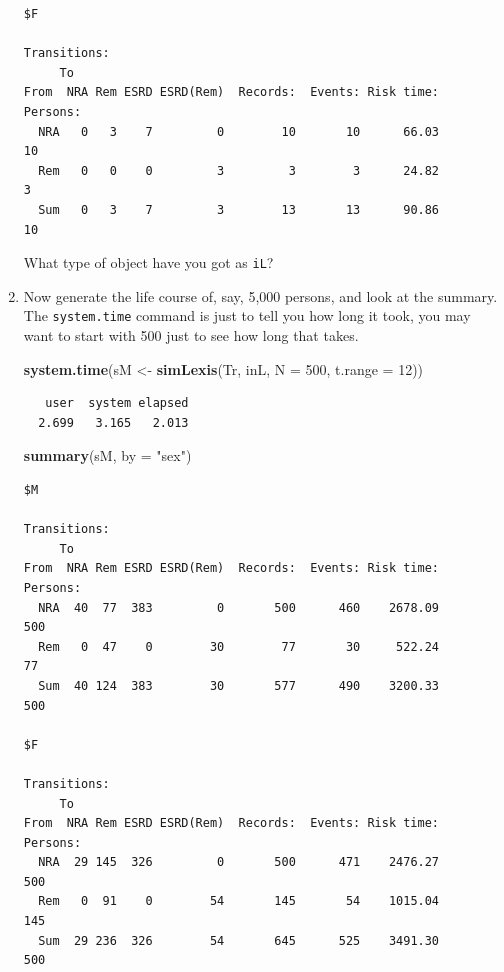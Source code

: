 \documentclass[
]{book}
\newenvironment{Shaded}{\begin{snugshade}}{\end{snugshade}}
\newcommand{\AttributeTok}[1]{\textcolor[rgb]{0.13,0.29,0.53}{#1}}
\newcommand{\DecValTok}[1]{\textcolor[rgb]{0.00,0.00,0.81}{#1}}
\newcommand{\FunctionTok}[1]{\textcolor[rgb]{0.13,0.29,0.53}{\textbf{#1}}}
\newcommand{\NormalTok}[1]{#1}
\newcommand{\OtherTok}[1]{\textcolor[rgb]{0.56,0.35,0.01}{#1}}
\newcommand{\StringTok}[1]{\textcolor[rgb]{0.31,0.60,0.02}{#1}}
\begin{document}
\begin{enumerate}
\begin{verbatim}
$F

Transitions:
     To
From  NRA Rem ESRD ESRD(Rem)  Records:  Events: Risk time:  Persons:
  NRA   0   3    7         0        10       10      66.03        10
  Rem   0   0    0         3         3        3      24.82         3
  Sum   0   3    7         3        13       13      90.86        10
\end{verbatim}

  What type of object have you got as \texttt{iL}?
\item
  Now generate the life course of, say, 5,000 persons, and look at the summary.
  The \texttt{system.time} command is just to tell you how long it
  took, you may want to start with 500 just to see how long that takes.

\begin{Shaded}
\begin{Highlighting}[]
\FunctionTok{system.time}\NormalTok{(sM }\OtherTok{\textless{}{-}} \FunctionTok{simLexis}\NormalTok{(Tr, inL, }\AttributeTok{N =} \DecValTok{500}\NormalTok{, }\AttributeTok{t.range =} \DecValTok{12}\NormalTok{))}
\end{Highlighting}
\end{Shaded}

\begin{verbatim}
   user  system elapsed 
  2.699   3.165   2.013 
\end{verbatim}

\begin{Shaded}
\begin{Highlighting}[]
\FunctionTok{summary}\NormalTok{(sM, }\AttributeTok{by =} \StringTok{"sex"}\NormalTok{)}
\end{Highlighting}
\end{Shaded}

\begin{verbatim}
$M

Transitions:
     To
From  NRA Rem ESRD ESRD(Rem)  Records:  Events: Risk time:  Persons:
  NRA  40  77  383         0       500      460    2678.09       500
  Rem   0  47    0        30        77       30     522.24        77
  Sum  40 124  383        30       577      490    3200.33       500

$F

Transitions:
     To
From  NRA Rem ESRD ESRD(Rem)  Records:  Events: Risk time:  Persons:
  NRA  29 145  326         0       500      471    2476.27       500
  Rem   0  91    0        54       145       54    1015.04       145
  Sum  29 236  326        54       645      525    3491.30       500
\end{verbatim}


\end{enumerate}
\end{document}
